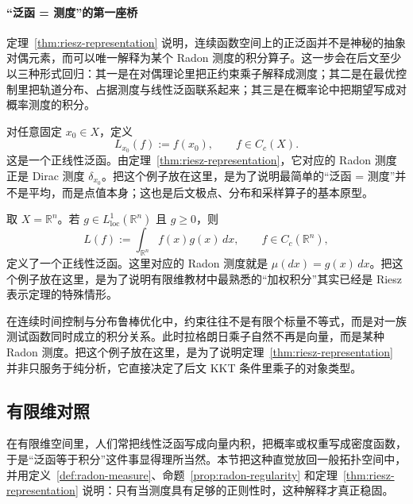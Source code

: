 \paragraph{“泛函 = 测度”的第一座桥}

\begin{remark}
定理~\ref{thm:riesz-representation} 说明，连续函数空间上的正泛函并不是神秘的抽象对偶元素，而可以唯一解释为某个 Radon 测度的积分算子。这一步会在后文至少以三种形式回归：其一是在对偶理论里把正约束乘子解释成测度；其二是在最优控制里把轨道分布、占据测度与线性泛函联系起来；其三是在概率论中把期望写成对概率测度的积分。
\end{remark}

\begin{example}\label{ex:dirac-functional}
对任意固定 $x_0\in X$，定义
\[
L_{x_0}(f):=f(x_0),\qquad f\in C_c(X).
\]
这是一个正线性泛函。由定理~\ref{thm:riesz-representation}，它对应的 Radon 测度正是 Dirac 测度 $\delta_{x_0}$。把这个例子放在这里，是为了说明最简单的“泛函 = 测度”并不是平均，而是点值本身；这也是后文极点、分布和采样算子的基本原型。
\end{example}

\begin{example}\label{ex:euclidean-radon}
取 $X=\mathbb R^n$。若 $g\in L^1_{\mathrm{loc}}(\mathbb R^n)$ 且 $g\ge0$，则
\[
L(f):=\int_{\mathbb R^n} f(x)g(x)\,dx,\qquad f\in C_c(\mathbb R^n),
\]
定义了一个正线性泛函。这里对应的 Radon 测度就是 $\mu(dx)=g(x)\,dx$。把这个例子放在这里，是为了说明有限维教材中最熟悉的“加权积分”其实已经是 Riesz 表示定理的特殊情形。
\end{example}

\begin{example}\label{ex:occupation-measure}
在连续时间控制与分布鲁棒优化中，约束往往不是有限个标量不等式，而是对一族测试函数同时成立的积分关系。此时拉格朗日乘子自然不再是向量，而是某种 Radon 测度。把这个例子放在这里，是为了说明定理~\ref{thm:riesz-representation} 并非只服务于纯分析，它直接决定了后文 KKT 条件里乘子的对象类型。
\end{example}

\subsection*{有限维对照}

在有限维空间里，人们常把线性泛函写成向量内积，把概率或权重写成密度函数，于是“泛函等于积分”这件事显得理所当然。本节把这种直觉放回一般拓扑空间中，并用定义~\ref{def:radon-measure}、命题~\ref{prop:radon-regularity} 和定理~\ref{thm:riesz-representation} 说明：只有当测度具有足够的正则性时，这种解释才真正稳固。

